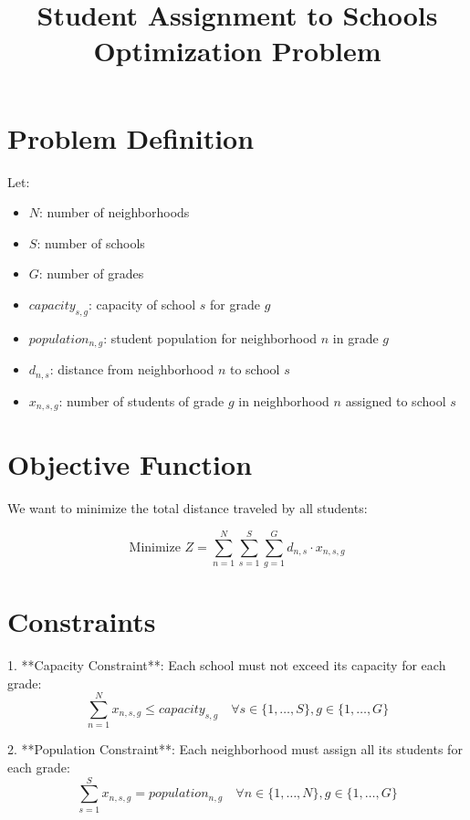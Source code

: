 \documentclass{article}
\begin{document}
\title{Student Assignment to Schools Optimization Problem}
\author{}
\date{}
\maketitle

\section*{Problem Definition}

Let:
\begin{itemize}
    \item \( N \): number of neighborhoods
    \item \( S \): number of schools
    \item \( G \): number of grades
    \item \( capacity_{s,g} \): capacity of school \( s \) for grade \( g \)
    \item \( population_{n,g} \): student population for neighborhood \( n \) in grade \( g \)
    \item \( d_{n,s} \): distance from neighborhood \( n \) to school \( s \)
    \item \( x_{n,s,g} \): number of students of grade \( g \) in neighborhood \( n \) assigned to school \( s \)
\end{itemize}

\section*{Objective Function}

We want to minimize the total distance traveled by all students:

\[
\text{Minimize } Z = \sum_{n=1}^{N} \sum_{s=1}^{S} \sum_{g=1}^{G} d_{n,s} \cdot x_{n,s,g}
\]

\section*{Constraints}

1. **Capacity Constraint**:
   Each school must not exceed its capacity for each grade:
   \[
   \sum_{n=1}^{N} x_{n,s,g} \leq capacity_{s,g} \quad \forall s \in \{1, \ldots, S\}, g \in \{1, \ldots, G\}
   \]

2. **Population Constraint**:
   Each neighborhood must assign all its students for each grade:
   \[
   \sum_{s=1}^{S} x_{n,s,g} = population_{n,g} \quad \forall n \in \{1, \ldots, N\}, g \in \{1, \ldots, G\}
   \]
\end{document}
